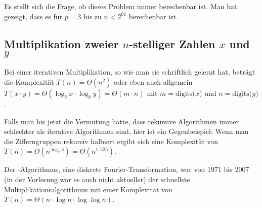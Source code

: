 Es stellt sich die Frage, ob dieses Problem immer berechenbar ist. Man hat gezeigt, dass es für $p=3$ bis zu $n<2^{61}$ berechenbar ist.

\subsection{Multiplikation zweier $n$-stelliger Zahlen $x$ und $y$}

Bei einer iterativen Multiplikation, so wie man sie schriftlich gelernt hat, beträgt die Komplexität $T(n)=\Theta(n^2)$ oder eben auch allgemein $T(x\cdot y)=\Theta(\log_b x\cdot\log_b y)=\Theta(m\cdot n)$ mit $m=\text{digits($x$)}$ und $n=\text{digits($y$)}$.

Falls man bis jetzt die Vermutung hatte, dass rekursive Algorithmen immer schlechter als iterative Algorithmen sind, hier ist ein Gegenbeispiel: Wenn man die Zifferngruppen rekursiv halbiert ergibt sich eine Komplexität von $T(n)=\Theta(n^{\log_2 3})=\Theta(n^{1,525})$.

Der -Algorithmus, eine diskrete Fourier-Transformation, war von 1971 bis 2007 (in der Vorlesung war es auch nicht aktueller) der schnellste Multiplikationsalgorithmus mit einer Komplexität von $T(n)=\Theta(n\cdot\log n\cdot\log\log n)$.